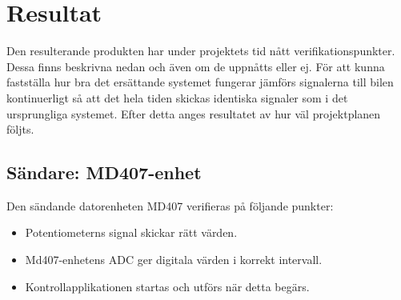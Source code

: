 \documentclass[a4paper]{article}
\begin{document}





\newpage
\section{Resultat}
Den resulterande produkten har under projektets tid nått verifikationspunkter. Dessa finns beskrivna nedan och även om de uppnåtts eller ej. För att kunna fastställa hur bra det ersättande systemet fungerar jämförs signalerna till bilen kontinuerligt så att det hela tiden skickas identiska signaler som i det ursprungliga systemet. Efter detta anges resultatet av hur väl projektplanen följts.


\subsection{Sändare: MD407-enhet}
Den sändande datorenheten MD407 verifieras på följande punkter:
\begin{itemize}
\item Potentiometerns signal skickar rätt värden.
\item Md407-enhetens ADC ger digitala värden i korrekt intervall.
\item Kontrollapplikationen startas och utförs när detta begärs.
\end{itemize}
\end{document}
